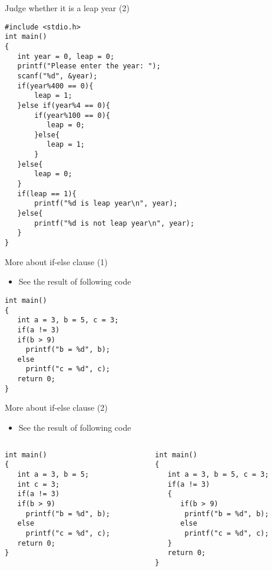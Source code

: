 \begin{frame}[fragile]{Judge whether it is a leap year (2)}
\vspace{-0.1in}
\begin{lstlisting}[basicstyle=\footnotesize]
#include <stdio.h>
int main()
{
   int year = 0, leap = 0;
   printf("Please enter the year: ");
   scanf("%d", &year);
   if(year%400 == 0){
       leap = 1;
   }else if(year%4 == 0){
       if(year%100 == 0){
          leap = 0;
       }else{
          leap = 1;
       }
   }else{
       leap = 0;
   }
   if(leap == 1){
       printf("%d is leap year\n", year);
   }else{
       printf("%d is not leap year\n", year);
   }
}
\end{lstlisting}

\end{frame}

\begin{frame}[fragile]{More about if-else clause (1)}
\begin{itemize}
	\item {See the result of following code}
\end{itemize}
\begin{lstlisting}
int main()
{  
   int a = 3, b = 5, c = 3;
   if(a != 3)
   if(b > 9)
     printf("b = %d", b);
   else 
     printf("c = %d", c);
   return 0;
}
\end{lstlisting}
\end{frame}

\begin{frame}[fragile]{More about if-else clause (2)}
\begin{itemize}
	\item {See the result of following code}
\end{itemize}
\begin{columns}
\begin{column}{0.48\linewidth}
\begin{lstlisting}[xleftmargin=0.05\linewidth]
int main()
{  
   int a = 3, b = 5;
   int c = 3;
   if(a != 3)
   if(b > 9)
     printf("b = %d", b);
   else 
     printf("c = %d", c);
   return 0;
}
\end{lstlisting}
\end{column}
\begin{column}{0.5\linewidth}
\begin{lstlisting}[xleftmargin=0.05\linewidth]
int main()
{  
   int a = 3, b = 5, c = 3;
   if(a != 3)
   {
      if(b > 9)
       printf("b = %d", b);
      else 
       printf("c = %d", c);
   }
   return 0;
}
\end{lstlisting}
\end{column}
\end{columns}
\end{frame}

